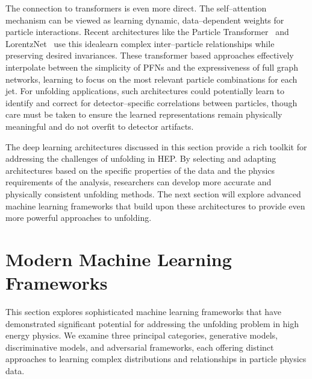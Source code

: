                     The connection to transformers is even more direct.
                    The self--attention mechanism can be viewed as learning dynamic, data--dependent weights for particle interactions.
                    Recent architectures like the Particle Transformer~\cite{Qu2022ParticleTagging} and LorentzNet~\cite{GongAnTagging} use this idealearn complex inter--particle relationships while preserving desired invariances.
                    These transformer based approaches effectively interpolate between the simplicity of PFNs and the expressiveness of full graph networks, learning to focus on the most relevant particle combinations for each jet.
                    For unfolding applications, such architectures could potentially learn to identify and correct for detector--specific correlations between particles, though care must be taken to ensure the learned representations remain physically meaningful and do not overfit to detector artifacts.

The deep learning architectures discussed in this section provide a rich toolkit for addressing the challenges of unfolding in HEP.
%
By selecting and adapting architectures based on the specific properties of the data and the physics requirements of the analysis, researchers can develop more accurate and physically consistent unfolding methods.
%
The next section will explore advanced machine learning frameworks that build upon these architectures to provide even more powerful approaches to unfolding.

\section{Modern Machine Learning Frameworks}
This section explores sophisticated machine learning frameworks that have demonstrated significant potential for addressing the unfolding problem in high energy physics.
%
We examine three principal categories, generative models, discriminative models, and adversarial frameworks, each offering distinct approaches to learning complex distributions and relationships in particle physics data.
